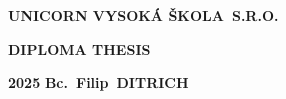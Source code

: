 \pagestyle{empty}
\begin{center}
{\Large\bfseries\MakeUppercase{Unicorn Vysoká škola~s.r.o.}}
	\vfill

	{\Huge\bfseries\MakeUppercase{Diploma Thesis}} \\

	\vfill

	\noindent\begin{minipage}{\textwidth}
		         \begin{Large}
			         \textbf{2025} \hfill \textbf{Bc.~Filip~\MakeUppercase{Ditrich}}
		         \end{Large}
	\end{minipage}
\end{center}
